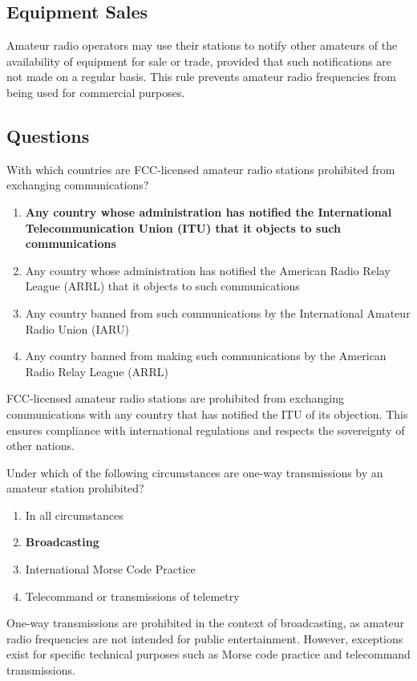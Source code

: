 \subsection*{Equipment Sales}
Amateur radio operators may use their stations to notify other amateurs of the availability of equipment for sale or trade, provided that such notifications are not made on a regular basis. This rule prevents amateur radio frequencies from being used for commercial purposes.

\subsection*{Questions}
\begin{tcolorbox}[colback=gray!10!white,colframe=black!75!black,title={T1D01}]
With which countries are FCC-licensed amateur radio stations prohibited from exchanging communications?
\begin{enumerate}[label=\Alph*),noitemsep]
    \item \textbf{Any country whose administration has notified the International Telecommunication Union (ITU) that it objects to such communications}
    \item Any country whose administration has notified the American Radio Relay League (ARRL) that it objects to such communications
    \item Any country banned from such communications by the International Amateur Radio Union (IARU)
    \item Any country banned from making such communications by the American Radio Relay League (ARRL)
\end{enumerate}
\end{tcolorbox}
FCC-licensed amateur radio stations are prohibited from exchanging communications with any country that has notified the ITU of its objection. This ensures compliance with international regulations and respects the sovereignty of other nations.


\begin{tcolorbox}[colback=gray!10!white,colframe=black!75!black,title={T1D02}]
Under which of the following circumstances are one-way transmissions by an amateur station prohibited?
\begin{enumerate}[label=\Alph*),noitemsep]
    \item In all circumstances
    \item \textbf{Broadcasting}
    \item International Morse Code Practice
    \item Telecommand or transmissions of telemetry
\end{enumerate}
\end{tcolorbox}
One-way transmissions are prohibited in the context of broadcasting, as amateur radio frequencies are not intended for public entertainment. However, exceptions exist for specific technical purposes such as Morse code practice and telecommand transmissions.

